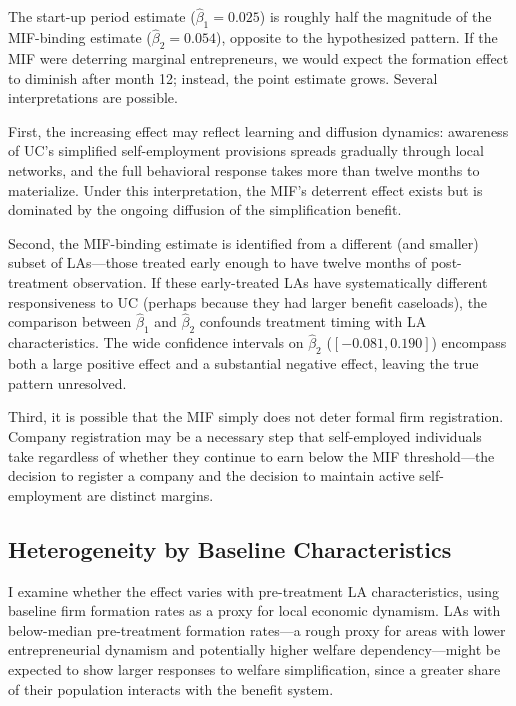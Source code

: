 \documentclass[12pt]{article}
\begin{document}
The start-up period estimate ($\hat{\beta}_1 = 0.025$) is roughly half the magnitude of the MIF-binding estimate ($\hat{\beta}_2 = 0.054$), opposite to the hypothesized pattern. If the MIF were deterring marginal entrepreneurs, we would expect the formation effect to diminish after month 12; instead, the point estimate grows. Several interpretations are possible.

First, the increasing effect may reflect learning and diffusion dynamics: awareness of UC's simplified self-employment provisions spreads gradually through local networks, and the full behavioral response takes more than twelve months to materialize. Under this interpretation, the MIF's deterrent effect exists but is dominated by the ongoing diffusion of the simplification benefit.

Second, the MIF-binding estimate is identified from a different (and smaller) subset of LAs---those treated early enough to have twelve months of post-treatment observation. If these early-treated LAs have systematically different responsiveness to UC (perhaps because they had larger benefit caseloads), the comparison between $\hat{\beta}_1$ and $\hat{\beta}_2$ confounds treatment timing with LA characteristics. The wide confidence intervals on $\hat{\beta}_2$ ($[-0.081, 0.190]$) encompass both a large positive effect and a substantial negative effect, leaving the true pattern unresolved.

Third, it is possible that the MIF simply does not deter formal firm registration. Company registration may be a necessary step that self-employed individuals take regardless of whether they continue to earn below the MIF threshold---the decision to register a company and the decision to maintain active self-employment are distinct margins.

\subsection{Heterogeneity by Baseline Characteristics}

I examine whether the effect varies with pre-treatment LA characteristics, using baseline firm formation rates as a proxy for local economic dynamism. LAs with below-median pre-treatment formation rates---a rough proxy for areas with lower entrepreneurial dynamism and potentially higher welfare dependency---might be expected to show larger responses to welfare simplification, since a greater share of their population interacts with the benefit system.
\end{document}
